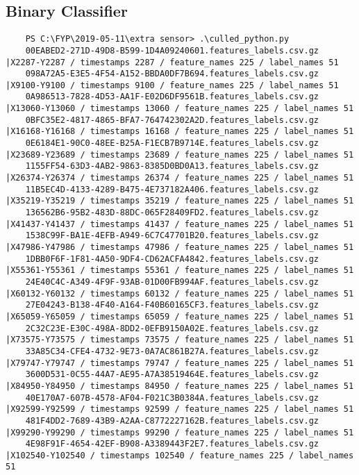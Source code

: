 \documentclass{UoNMCHA}
\numberwithin{equation}{section}
\begin{document}
\subsection{Binary Classifier}
\begin{lstlisting}
    PS C:\FYP\2019-05-11\extra sensor> .\culled_python.py
    00EABED2-271D-49D8-B599-1D4A09240601.features_labels.csv.gz |X2287-Y2287 / timestamps 2287 / feature_names 225 / label_names 51
    098A72A5-E3E5-4F54-A152-BBDA0DF7B694.features_labels.csv.gz |X9100-Y9100 / timestamps 9100 / feature_names 225 / label_names 51
    0A986513-7828-4D53-AA1F-E02D6DF9561B.features_labels.csv.gz |X13060-Y13060 / timestamps 13060 / feature_names 225 / label_names 51
    0BFC35E2-4817-4865-BFA7-764742302A2D.features_labels.csv.gz |X16168-Y16168 / timestamps 16168 / feature_names 225 / label_names 51
    0E6184E1-90C0-48EE-B25A-F1ECB7B9714E.features_labels.csv.gz |X23689-Y23689 / timestamps 23689 / feature_names 225 / label_names 51
    1155FF54-63D3-4AB2-9863-8385D0BD0A13.features_labels.csv.gz |X26374-Y26374 / timestamps 26374 / feature_names 225 / label_names 51
    11B5EC4D-4133-4289-B475-4E737182A406.features_labels.csv.gz |X35219-Y35219 / timestamps 35219 / feature_names 225 / label_names 51
    136562B6-95B2-483D-88DC-065F28409FD2.features_labels.csv.gz |X41437-Y41437 / timestamps 41437 / feature_names 225 / label_names 51
    1538C99F-BA1E-4EFB-A949-6C7C47701B20.features_labels.csv.gz |X47986-Y47986 / timestamps 47986 / feature_names 225 / label_names 51
    1DBB0F6F-1F81-4A50-9DF4-CD62ACFA4842.features_labels.csv.gz |X55361-Y55361 / timestamps 55361 / feature_names 225 / label_names 51
    24E40C4C-A349-4F9F-93AB-01D00FB994AF.features_labels.csv.gz |X60132-Y60132 / timestamps 60132 / feature_names 225 / label_names 51
    27E04243-B138-4F40-A164-F40B60165CF3.features_labels.csv.gz |X65059-Y65059 / timestamps 65059 / feature_names 225 / label_names 51
    2C32C23E-E30C-498A-8DD2-0EFB9150A02E.features_labels.csv.gz |X73575-Y73575 / timestamps 73575 / feature_names 225 / label_names 51
    33A85C34-CFE4-4732-9E73-0A7AC861B27A.features_labels.csv.gz |X79747-Y79747 / timestamps 79747 / feature_names 225 / label_names 51
    3600D531-0C55-44A7-AE95-A7A38519464E.features_labels.csv.gz |X84950-Y84950 / timestamps 84950 / feature_names 225 / label_names 51
    40E170A7-607B-4578-AF04-F021C3B0384A.features_labels.csv.gz |X92599-Y92599 / timestamps 92599 / feature_names 225 / label_names 51
    481F4DD2-7689-43B9-A2AA-C8772227162B.features_labels.csv.gz |X99290-Y99290 / timestamps 99290 / feature_names 225 / label_names 51
    4E98F91F-4654-42EF-B908-A3389443F2E7.features_labels.csv.gz |X102540-Y102540 / timestamps 102540 / feature_names 225 / label_names 51

\end{lstlisting}
\end{document}
